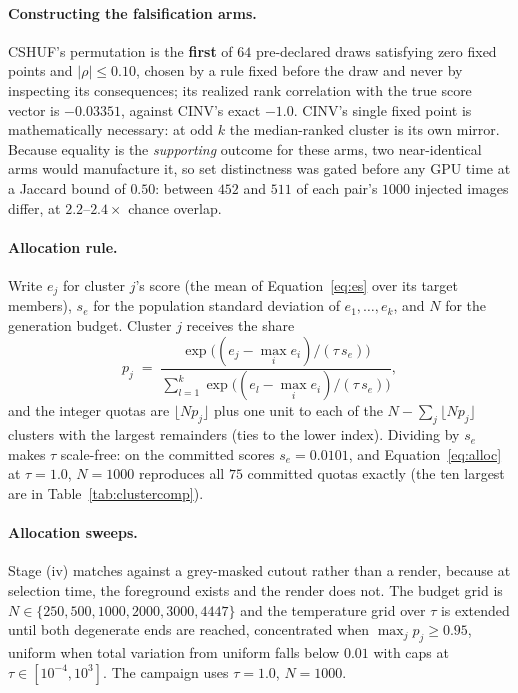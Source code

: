 \documentclass{article}
\newcommand{\atemp}{\tau}
\begin{document}
\paragraph{Constructing the falsification arms.} CSHUF's permutation is the \textbf{first} of $64$
pre-declared draws satisfying zero fixed points and $|\rho| \leq 0.10$, chosen by a rule fixed
before the draw and never by inspecting its consequences; its realized rank correlation with the
true score vector is $-0.03351$, against CINV's exact $-1.0$. CINV's single fixed point is
mathematically necessary: at odd $k$ the median-ranked cluster is its own mirror. Because equality
is the \emph{supporting} outcome for these arms, two near-identical arms would manufacture it, so
set distinctness was gated before any GPU time at a Jaccard bound of $0.50$: between $452$ and $511$
of each pair's $1000$ injected images differ, at $2.2$--$2.4\times$ chance overlap.

\paragraph{Allocation rule.} Write $e_j$ for cluster $j$'s score (the mean of Equation~\ref{eq:es}
over its target members), $s_e$ for the population standard deviation of $e_1, \dots, e_k$, and $N$
for the generation budget. Cluster $j$ receives the share
\begin{equation}
p_j \;=\; \frac{\exp\!\big((e_j - \max_i e_i)/(\atemp\, s_e)\big)}{\sum_{l=1}^{k} \exp\!\big((e_l - \max_i e_i)/(\atemp\, s_e)\big)},
\label{eq:alloc}
\end{equation}
and the integer quotas are $\lfloor N p_j \rfloor$ plus one unit to each of the $N - \sum_j \lfloor N p_j \rfloor$
clusters with the largest remainders (ties to the lower index). Dividing by $s_e$ makes $\atemp$
scale-free: on the committed scores $s_e = 0.0101$, and Equation~\ref{eq:alloc} at $\atemp = 1.0$,
$N = 1000$ reproduces all $75$ committed quotas exactly (the ten largest are in
Table~\ref{tab:clustercomp}).

\paragraph{Allocation sweeps.} Stage (iv) matches against a grey-masked cutout rather than a render,
because at selection time, the foreground exists and the render does not. The budget grid is
$N \in \{250, 500, 1000, 2000, 3000, 4447\}$ and the temperature grid over $\atemp$ is extended
until both degenerate ends are reached, concentrated when $\max_j p_j \geq 0.95$, uniform when
total variation from uniform falls below $0.01$ with caps at $\atemp \in [10^{-4}, 10^{3}]$. The
campaign uses $\atemp = 1.0$, $N = 1000$.
\end{document}
